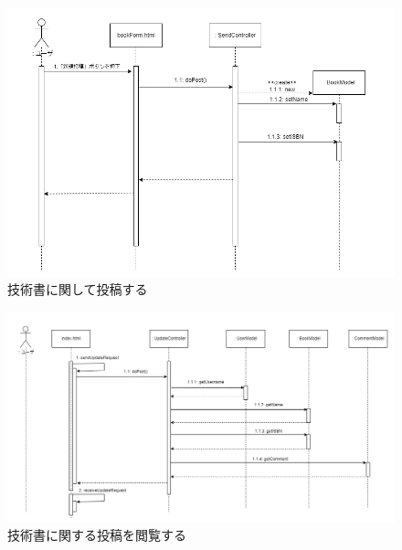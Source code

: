 \documentclass[dvipdfmx]{jsarticle}
\begin{document}
    \begin{figure}[H]
        \begin{center}
            \caption*{技術書に関して投稿する}
            \includegraphics[scale=0.6,clip]{pictures/sequence-graph/sendAboutBook.png}
        \end{center}
    \end{figure}

    \begin{figure}[H]
        \begin{center}
            \caption*{技術書に関する投稿を閲覧する}
            \includegraphics[scale=0.45,clip]{pictures/sequence-graph/watchMessages.png}
        \end{center}
    \end{figure}
\end{document}
